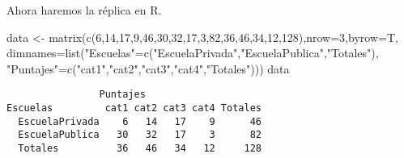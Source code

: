 \documentclass[
  a4paper,
  oneside,
  openany]{book}
\newenvironment{Shaded}{\begin{snugshade}}{\end{snugshade}}
\newcommand{\AttributeTok}[1]{\textcolor[rgb]{0.77,0.63,0.00}{#1}}
\newcommand{\DecValTok}[1]{\textcolor[rgb]{0.00,0.00,0.81}{#1}}
\newcommand{\FunctionTok}[1]{\textcolor[rgb]{0.00,0.00,0.00}{#1}}
\newcommand{\NormalTok}[1]{#1}
\newcommand{\OtherTok}[1]{\textcolor[rgb]{0.56,0.35,0.01}{#1}}
\newcommand{\StringTok}[1]{\textcolor[rgb]{0.31,0.60,0.02}{#1}}
\begin{document}
Ahora haremos la réplica en R.

\begin{Shaded}
\begin{Highlighting}[]
\NormalTok{data }\OtherTok{\textless{}{-}} \FunctionTok{matrix}\NormalTok{(}\FunctionTok{c}\NormalTok{(}\DecValTok{6}\NormalTok{,}\DecValTok{14}\NormalTok{,}\DecValTok{17}\NormalTok{,}\DecValTok{9}\NormalTok{,}\DecValTok{46}\NormalTok{,}\DecValTok{30}\NormalTok{,}\DecValTok{32}\NormalTok{,}\DecValTok{17}\NormalTok{,}\DecValTok{3}\NormalTok{,}\DecValTok{82}\NormalTok{,}\DecValTok{36}\NormalTok{,}\DecValTok{46}\NormalTok{,}\DecValTok{34}\NormalTok{,}\DecValTok{12}\NormalTok{,}\DecValTok{128}\NormalTok{),}\AttributeTok{nrow=}\DecValTok{3}\NormalTok{,}\AttributeTok{byrow=}\NormalTok{T, }
               \AttributeTok{dimnames=}\FunctionTok{list}\NormalTok{(}\StringTok{"Escuelas"}\OtherTok{=}\FunctionTok{c}\NormalTok{(}\StringTok{"EscuelaPrivada"}\NormalTok{,}\StringTok{"EscuelaPublica"}\NormalTok{,}\StringTok{"Totales"}\NormalTok{), }
                             \StringTok{"Puntajes"}\OtherTok{=}\FunctionTok{c}\NormalTok{(}\StringTok{"cat1"}\NormalTok{,}\StringTok{"cat2"}\NormalTok{,}\StringTok{"cat3"}\NormalTok{,}\StringTok{"cat4"}\NormalTok{,}\StringTok{"Totales"}\NormalTok{)))}
\NormalTok{data}
\end{Highlighting}
\end{Shaded}

\begin{verbatim}
                Puntajes
Escuelas         cat1 cat2 cat3 cat4 Totales
  EscuelaPrivada    6   14   17    9      46
  EscuelaPublica   30   32   17    3      82
  Totales          36   46   34   12     128
\end{verbatim}
\end{document}

